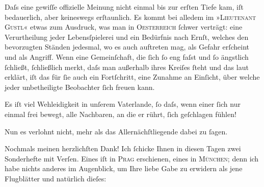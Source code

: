 \pstart
           Daſs eine gewiſſe offizielle Meinung nicht einmal bis zur erſten Tiefe kam, iſt
               bedauerlich, aber keineswegs erſtaunlich. Es kommt bei alledem im »\textsc{Lieutenant Gustl}« etwas zum Ausdruck, was man in \textsc{Oesterreich}{ }ſchwer verträgt: eine Verurtheilung jeder Lebensſpielerei und ein Bedürfnis nach Ernſt, welches den bevorzugten Ständen
               jedesmal, wo es auch auftreten mag, als Gefahr er{\pb}ſcheint und als Angriff. Wenn eine
               Gemeinſchaft, die{ }ſich{ }ſo eng faſst und{ }ſo ängstlich{ }ſchließt,{ }ſchließlich merkt,
               daſs man außerhalb ihres Kreiſes{ }ſteht und das laut erklärt, iſt das für{ }ſie auch ein
               Fortſchritt, eine Zunahme an Einſicht, über welche jeder unbetheiligte Beobachter{ }ſich freuen kann.\pend
           
\pstart
           Es iſt viel Wehleidigkeit in unſerem Vaterlande,{ }ſo daſs, wenn einer{ }ſich nur einmal frei bewegt, alle Nachbaren,
               an die er rührt,{ }ſich geſchlagen fühlen!\pend
           
\pstart
           Nun es verlohnt nicht, mehr als das Allernächſtliegende dabei zu{ }ſagen.\pend
           
\pstart
           Nochmals meinen herzlichſten Dank! Ich{ }ſchicke Ihnen in diesen Tag\introOben{}en\introOben{} zwei
               Sonderhefte mit Verſen. Eines iſt in
                  \textsc{Prag} erschienen, eines in \textsc{München}; denn ich habe nichts anderes im Augenblick, um Ihre liebe Gabe zu erwidern als
               jene Flugblätter und natürlich
               dieſes:\pend
           
